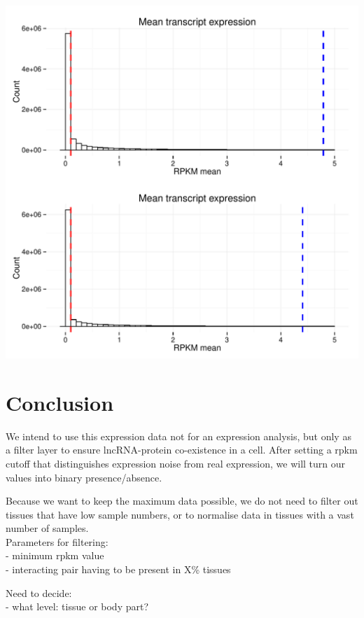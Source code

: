 \documentclass{article}\usepackage[]{graphicx}\usepackage[]{color}
\makeatletter
\def\maxwidth{ %
  \ifdim\Gin@nat@width>\linewidth
    \linewidth
  \else
    \Gin@nat@width
  \fi
}
\newenvironment{knitrout}{}{} %
\makeatother
\begin{document}
\begin{knitrout}
\includegraphics[width=\maxwidth]{figure/transcript_expression_averages-2} 

\end{knitrout}

\section{Conclusion}

We intend to use this expression data not for an expression analysis, but only as a filter layer to ensure lncRNA-protein co-existence in a cell. After setting a rpkm cutoff that distinguishes expression noise from real expression, we will turn our values into binary presence/absence.\par
Because we want to keep the maximum data possible, we do not need to filter out tissues that have low sample numbers, or to normalise data in tissues with a vast number of samples.\\


Parameters for filtering:\\
- minimum rpkm value\\
- interacting pair having to be present in X\% tissues

Need to decide:\\
- what level: tissue or body part?\\
\end{document}
